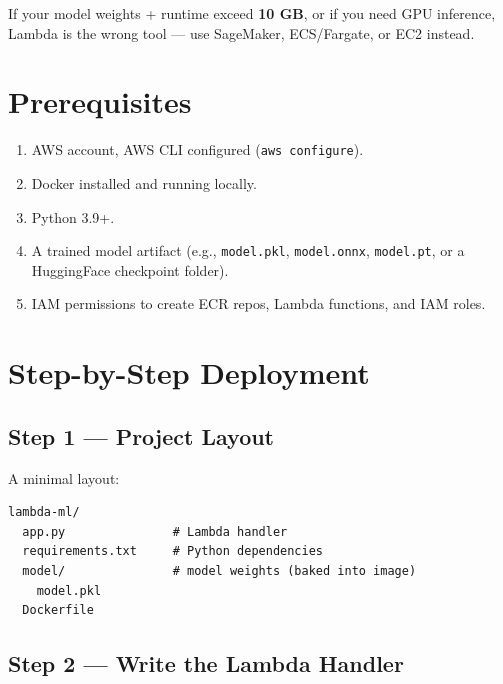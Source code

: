 \documentclass[11pt,a4paper]{article}
\begin{document}
\begin{warnbox}
If your model weights + runtime exceed \textbf{10 GB}, or if you need GPU
inference, Lambda is the wrong tool --- use SageMaker, ECS/Fargate, or EC2
instead.
\end{warnbox}

\section{Prerequisites}

\begin{enumerate}[leftmargin=*]
    \item AWS account, AWS CLI configured (\texttt{aws configure}).
    \item Docker installed and running locally.
    \item Python 3.9+.
    \item A trained model artifact (e.g., \texttt{model.pkl},
          \texttt{model.onnx}, \texttt{model.pt}, or a HuggingFace checkpoint
          folder).
    \item IAM permissions to create ECR repos, Lambda functions, and IAM roles.
\end{enumerate}

\section{Step-by-Step Deployment}

\subsection{Step 1 --- Project Layout}

A minimal layout:

\begin{lstlisting}[style=bashcode]
lambda-ml/
  app.py               # Lambda handler
  requirements.txt     # Python dependencies
  model/               # model weights (baked into image)
    model.pkl
  Dockerfile
\end{lstlisting}

\subsection{Step 2 --- Write the Lambda Handler}
\end{document}
